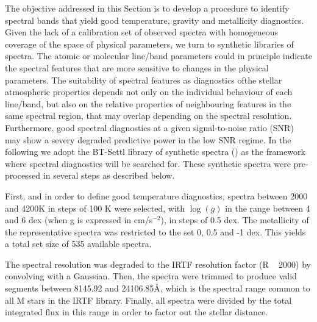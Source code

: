 

{ The objective addressed in this Section is to develop a procedure to
  identify spectral bands that yield good temperature, gravity and
  metallicity diagnostics. Given the lack of a calibration set of
  observed spectra with homogeneous coverage of the space of physical
  parameters, we turn to synthetic libraries of spectra. The atomic or
  molecular line/band parameters could in principle indicate the
  spectral features that are more sensitive to changes in the physical
  parameters. The suitability of spectral features as diagnostics
  ofthe stellar atmospheric properties depends not only on the
  individual behaviour of each line/band, but also on the relative
  properties of neighbouring features in the same spectral region,
  that may overlap depending on the spectral resolution. Furthermore,
  good spectral diagnostics at a given signal-to-noise ratio (SNR) may
  show a severy degraded predictive power in the low SNR regime. In
  the following we adopt the BT-Settl library of synthetic spectra
  (\cite{2013MSAIS..24..128A}) as the framework where spectral
  diagnostics will be searched for. These synthetic spectra were
  pre-processed in several steps as described below.}

{ First, and in order to define good temperature diagnostics, spectra
between 2000 and 4200K in steps of 100 K were selected, with $\log(g)$
in the range between 4 and 6 dex (when g is expressed in cm/s$^{-2}$),
in steps of 0.5 dex. The metallicity of the representative spectra was
restricted to the set 0, 0.5 and -1 dex.  This yields a total set
size of 535 available spectra.

The spectral resolution was degraded to the IRTF resolution factor (R
~ 2000) by convolving with a Gaussian. Then, the spectra were trimmed
to produce valid segments between 8145.92 and 24106.85{\AA}, which is
the spectral range common to all M stars in the IRTF library. Finally,
all spectra were divided by the total integrated flux in this range in
order to factor out the stellar distance.}


